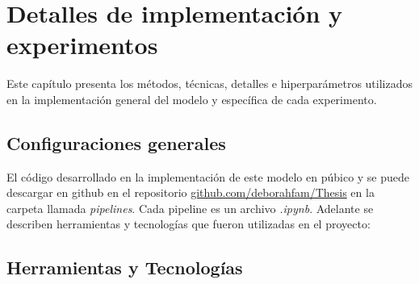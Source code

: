 \chapter{Detalles de implementación y experimentos}\label{chapter:implementation}

Este capítulo presenta los métodos, técnicas, detalles e hiperparámetros utilizados en la implementación general del modelo y específica de cada experimento.

\section*{Configuraciones generales}

El código desarrollado en la implementación de este modelo en púbico y se puede descargar en github en el repositorio \href{https://github.com/deborahfam/Thesis}{github.com/deborahfam/Thesis} en la carpeta llamada \textit{pipelines}. Cada pipeline es un archivo \textit{.ipynb}. Adelante se describen herramientas y tecnologías que fueron utilizadas en el proyecto:

\section*{Herramientas y Tecnologías}

